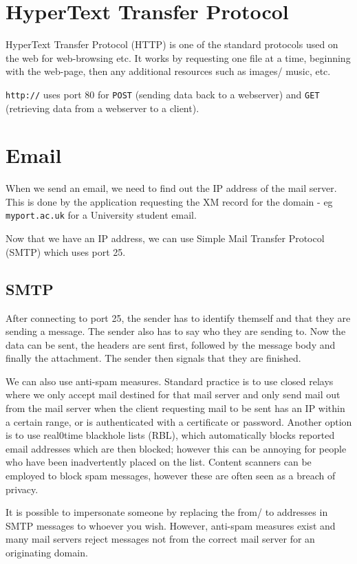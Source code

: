 
\section*{HyperText Transfer Protocol}
HyperText Transfer Protocol (HTTP) is one of the standard protocols used on the web for web-browsing etc. It works by requesting one file at a time, beginning with the web-page, then any additional resources such as images/ music, etc. 

\verb|http://| uses port 80 for \verb|POST| (sending data back to a webserver) and \verb|GET| (retrieving data from a webserver to a client). 

\section*{Email}
When we send an email, we need to find out the IP address of the mail server. This is done by the application requesting the XM record for the domain - eg \verb|myport.ac.uk| for a University student email.

Now that we have an IP address, we can use Simple Mail Transfer Protocol (SMTP) which uses port 25. 
\subsection*{SMTP}
After connecting to port 25, the sender has to identify themself and that they are sending a message. The sender also has to say who they are sending to. Now the data can be sent, the headers are sent first, followed by the message body and finally the attachment. The sender then signals that they are finished. 

We can also use anti-spam measures. Standard practice is to use closed relays where we only accept mail destined for that mail server and only send mail out from the mail server when the client requesting mail to be sent has an IP within a certain range, or is authenticated with a certificate or password. Another option is to use real0time blackhole lists (RBL), which automatically blocks reported email addresses which are then blocked; however this can be annoying for people who have been inadvertently placed on the list. Content scanners can be employed to block spam messages, however these are often seen as a breach of privacy.

It is possible to impersonate someone by replacing the from/ to addresses in SMTP messages to whoever you wish. However, anti-spam measures exist and many mail servers reject messages not from the correct mail server for an originating domain. 

